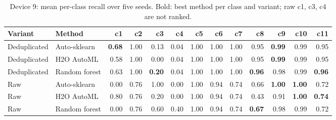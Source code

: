 \begin{table}[t]
\centering
\caption{Device 9: mean per-class recall over five seeds. Bold: best method per class and variant; raw c1, c3, c4 are not ranked.}
\label{tab:perclass9}
\scriptsize
\setlength{\tabcolsep}{3pt}
\begin{tabular}{@{}llrrrrrrrrrrr@{}}
\toprule
Variant & Method & c1 & c2 & c3 & c4 & c5 & c6 & c7 & c8 & c9 & c10 & c11 \\
\midrule
Deduplicated & Auto-sklearn & \textbf{0.68} & 1.00 & 0.13 & 0.04 & 1.00 & 1.00 & 1.00 & 0.95 & \textbf{0.99} & 0.99 & 0.95 \\
Deduplicated & H2O AutoML & 0.58 & 1.00 & 0.00 & 0.04 & 1.00 & 1.00 & 1.00 & 0.95 & \textbf{0.99} & 0.99 & 0.95 \\
Deduplicated & Random forest & 0.63 & 1.00 & \textbf{0.20} & 0.04 & 1.00 & 1.00 & 1.00 & \textbf{0.96} & 0.98 & 0.99 & \textbf{0.96} \\
\midrule
Raw & Auto-sklearn & 0.00 & 0.76 & 1.00 & 0.00 & 1.00 & 0.94 & 0.74 & 0.66 & \textbf{1.00} & \textbf{1.00} & 0.72 \\
Raw & H2O AutoML & 0.80 & 0.76 & 0.20 & 0.00 & 1.00 & 0.94 & 0.74 & 0.43 & 0.91 & \textbf{1.00} & \textbf{0.74} \\
Raw & Random forest & 0.00 & 0.76 & 0.60 & 0.40 & 1.00 & 0.94 & 0.74 & \textbf{0.67} & 0.98 & 0.99 & 0.72 \\
\bottomrule
\end{tabular}
\end{table}
